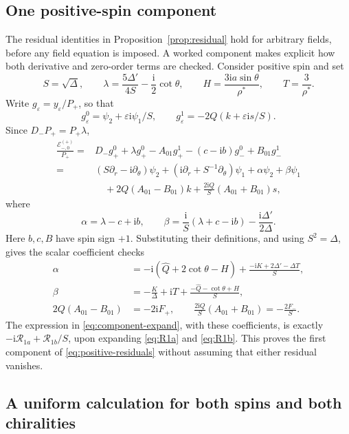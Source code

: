 \documentclass[11pt,a4paper]{article}
\numberwithin{equation}{section}
\theoremstyle{definition}
\theoremstyle{remark}
\newcommand{\I}{\mathrm i}
\newcommand{\Res}{\mathcal R}
\newcommand{\cE}{\mathcal E}
\begin{document}
\subsection{One positive-spin component}

The residual identities in Proposition~\ref{prop:residual} hold for
arbitrary fields, before any field equation is imposed.  A worked
component makes explicit how both derivative and zero-order terms are
checked.  Consider positive spin and set
\[
 S=\sqrt\Delta,\qquad
 \lambda=\frac{5\Delta'}{4S}-\frac{\I}{2}\cot\theta,\qquad
 H=\frac{3\I a\sin\theta}{\rho^*},\qquad
 T=\frac3{\rho^*}.
\]
Write \(g_\varepsilon=y_\varepsilon/P_+\), so that
\[
 g_\varepsilon^0=\psi_2+\varepsilon\I\psi_1/S,\qquad
 g_\varepsilon^1=-2Q(k+\varepsilon\I s/S).
\]
Since \(D_-P_+=P_+\lambda\),
\begin{align}
 \frac{\cE_{-,0}^{(+)}}{P_+}
 ={}&D_-g_+^0+\lambda g_+^0
       -A_{01}g_+^1-(c-\I b)g_-^0+B_{01}g_-^1\nonumber\\
 ={}&(S\partial_r-\I\partial_\theta)\psi_2
       +(\I\partial_r+S^{-1}\partial_\theta)\psi_1
       +\alpha\psi_2+\beta\psi_1\nonumber\\
 &\quad+2Q(A_{01}-B_{01})k
       +\frac{2\I Q}{S}(A_{01}+B_{01})s,
\label{eq:component-expand}
\end{align}
where
\begin{equation}
 \alpha=\lambda-c+\I b,\qquad
 \beta=\frac{\I}{S}(\lambda+c-\I b)
                 -\frac{\I\Delta'}{2\Delta}.
\label{eq:alphabeta}
\end{equation}
Here \(b,c,B\) have spin sign \(+1\).  Substituting their definitions,
and using \(S^2=\Delta\), gives the scalar coefficient checks
\begin{align}
 \alpha
 &=-\I(\widehat Q+2\cot\theta-H)
     +\frac{-\I K+2\Delta'-\Delta T}{S},
 \label{eq:alpha-check}\\
 \beta
 &=-\frac K\Delta+\I T
     +\frac{-\widehat Q-\cot\theta+H}{S},
 \label{eq:beta-check}\\
 2Q(A_{01}-B_{01})&=-2\I F_+,\qquad
 \frac{2\I Q}{S}(A_{01}+B_{01})=-\frac{2F_-}{S}.
 \label{eq:coupling-check}
\end{align}
The expression in \eqref{eq:component-expand}, with these coefficients,
is exactly \(-\I\Res_{1a}+\Res_{1b}/S\), upon expanding
\eqref{eq:R1a} and \eqref{eq:R1b}.  This proves the first component of
\eqref{eq:positive-residuals} without assuming that either residual
vanishes.

\subsection{A uniform calculation for both spins and both chiralities}
\label{app:uniform}
\end{document}
